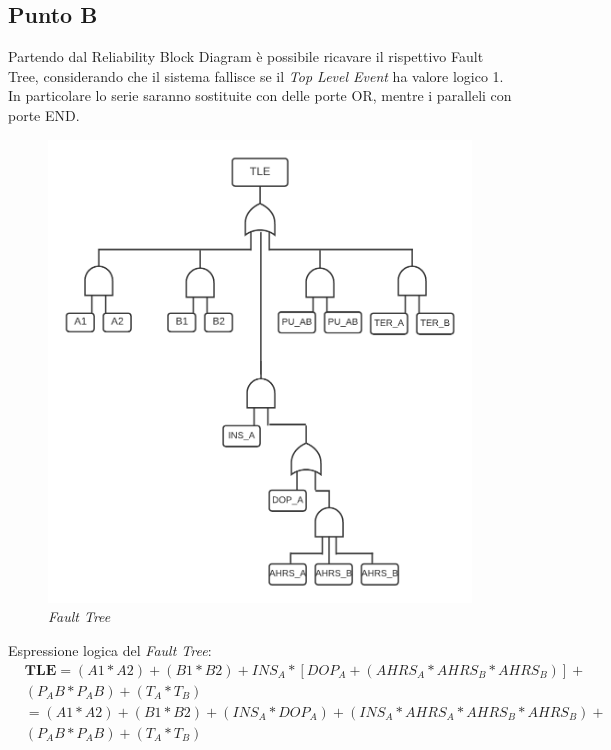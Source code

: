 \subsection{Punto B}
Partendo dal Reliability Block Diagram è possibile ricavare il rispettivo Fault Tree, considerando che il sistema fallisce se il \textit{Top Level Event} ha valore logico 1.
\\In particolare lo serie saranno sostituite con delle porte OR, mentre i paralleli con porte END. 
\begin{figure}[H]
	\centering
	\includegraphics[width=\textwidth]{img/hw5/es5_FT.png}
	\caption{\textit{Fault Tree}}
\end{figure}
Espressione logica del \textit{Fault Tree}:
\begin{equation*}
	\begin{split}
		&\textbf{TLE} = (A1*A2)+(B1*B2)+{INS_A*[DOP_A+(AHRS_A*AHRS_B*AHRS_B)]}+ \\
		&(P_AB*P_AB)+(T_A*T_B) \\
		&=(A1*A2)+(B1*B2)+(INS_A*DOP_A)+(INS_A*AHRS_A*AHRS_B*AHRS_B)+ \\
		&(P_AB*P_AB)+(T_A*T_B)
	\end{split}
\end{equation*}
